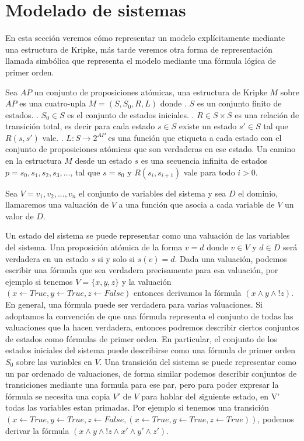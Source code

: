 \section{Modelado de sistemas}
En esta sección veremos cómo representar un modelo explícitamente mediante una estructura de Kripke, más tarde veremos otra forma de representación llamada simbólica que representa el modelo mediante una fórmula lógica de primer orden.

Sea $AP$ un conjunto de proposiciones atómicas, una estructura de Kripke $M$ sobre $AP$ es una cuatro-upla $M = (S, S_{0}, R, L)$ donde
. $S$ es un conjunto finito de estados.
. $S_{0} \in S$ es el conjunto de estados iniciales.
. $R \in S \times S$ es una relación de transición total, es decir para cada estado $s \in S$ existe un estado $s' \in S$ tal que $R(s,s')$ vale.
. $L \colon S \to 2^{AP}$ es una función que etiqueta a cada estado con el conjunto de proposiciones atómicas que son verdaderas en ese estado.
Un camino en la estructura $M$ desde un estado $s$ es una secuencia infinita de estados $p = s_{0}, s_{1}, s_{2}, s_{3}, ...$, tal que $s = s_{0}$ y $R(s_{i},s_{i+1})$ vale para todo $i>0$.

Sea $V = {v_{1}, v_{2}, ..., v_{n}}$ el conjunto de variables del sistema y sea $D$ el dominio, llamaremos una valuación de $V$ a una función que asocia a cada variable de $V$ un valor de $D$.

Un estado del sistema se puede representar como una valuación de las variables del sistema. Una proposición atómica de la forma $v = d$ donde $v \in V$ y $d \in D$ será verdadera en un estado $s$ si y solo si $s(v) = d$.
Dada una valuación, podemos escribir una fórmula que sea verdadera precisamente para esa valuación, por ejemplo si tenemos $V = \{x,y,z\}$ y la valuación $(x \gets True, y \gets True, z \gets False)$ entonces derivamos la fórmula $(x \land y \land !z)$. En general, una fórmula puede ser verdadera para varias valuaciones. Si adoptamos la convención de que una fórmula representa el conjunto de todas las valuaciones que la hacen verdadera, entonces podremos describir ciertos conjuntos de estados como fórmulas de primer orden.
En particular, el conjunto de los estados iniciales del sistema puede describirse como una fórmula de primer orden $S_{0}$ sobre las variables en $V$.
Una transición del sistema se puede representar como un par ordenado de valuaciones, de forma similar podemos describir conjuntos de transiciones mediante una formula para ese par, pero para poder expresar la fórmula se necesita una copia $V'$ de $V$ para hablar del \emph siguiente estado, en V' todas las variables estan primadas. Por ejemplo si tenemos una transición $(x \gets True, y \gets True, z \gets False,(x \gets True, y \gets True, z \gets True))$, podemos derivar la fórmula $(x \land y \land !z \land x' \land y' \land z')$.


